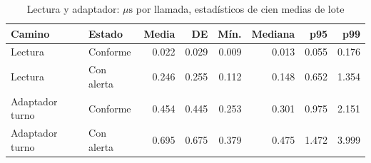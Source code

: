 \begin{table}[!t]
\caption{Lectura y adaptador: $\mu\mathrm{s}$ por llamada, estadísticos de cien medias de lote}
\label{tab:supplement_time}\centering\footnotesize
\begin{tabular*}{\textwidth}{@{\extracolsep{\fill}}llrrrrrr}\hline
Camino & Estado & Media & DE & Mín. & Mediana & p95 & p99\\\hline
Lectura & Conforme & 0.022 & 0.029 & 0.009 & 0.013 & 0.055 & 0.176\\
Lectura & Con alerta & 0.246 & 0.255 & 0.112 & 0.148 & 0.652 & 1.354\\
Adaptador turno & Conforme & 0.454 & 0.445 & 0.253 & 0.301 & 0.975 & 2.151\\
Adaptador turno & Con alerta & 0.695 & 0.675 & 0.379 & 0.475 & 1.472 & 3.999\\
\hline\end{tabular*}\end{table}
